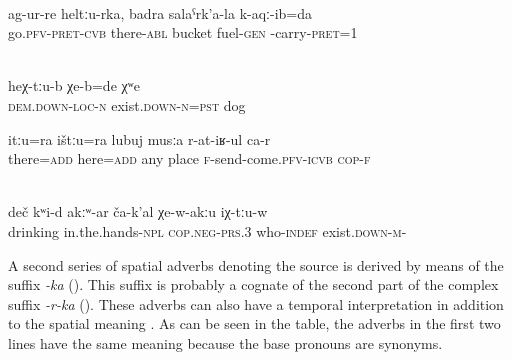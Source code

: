 \begin{exe}

	\ex	{}	\label{ex:I went away from there carrying a bucket of fuel}\\
	\gll	ag-ur-re	heltːu-rka,	badra	salaˁrk'a-la	k-aqː-ib=da  \\
		go.\textsc{pfv}-\textsc{pret}-\textsc{cvb}	there-\textsc{abl}	bucket	fuel-\textsc{gen}	-carry-\textsc{pret}=1\\
	\glt	{}

	\ex	{}	\label{ex:The dog was there}\\
	\gll	heχ-tːu-b	χe-b=de	χʷe\\
		\textsc{dem.down}-\textsc{loc}-\textsc{n}	exist.\textsc{down-n}=\textsc{pst}	dog\\
	\glt	{}

\ex	\label{ex:There, here (her husband) sends her everywhere}
	\gll	itːu=ra		ištːu=ra	lubuj	musːa	r-at-iʁ-ul ca-r  \\
		there=\textsc{add}	here=\textsc{add}	any	place	\textsc{f}-send-come.\textsc{pfv}-\textsc{icvb} \textsc{cop-f}\\
	\glt	{}
	
	\ex	{}	\label{ex:There is nobody here without a drink in the hands}\\
	\gll	deč	kʷi-d	akːʷ-ar	ča-k'al	χe-w-akːu	iχ-tːu-w\\ 
	 	drinking	  in.the.hands-\textsc{npl}   	\textsc{cop.neg}-\textsc{prs.3}	 who-\textsc{indef}	exist.\textsc{down-m}-	 \\
	\glt	{}
\end{exe}

A second series of spatial adverbs denoting the source is derived by means of the suffix \textit{-ka}  (). This suffix is probably a cognate of the second part of the complex  suffix \textit{-r-ka} (). These adverbs can also have a temporal interpretation  in addition to the spatial meaning . As can be seen in the table, the adverbs in the first two lines have the same meaning because the base pronouns are synonyms.

